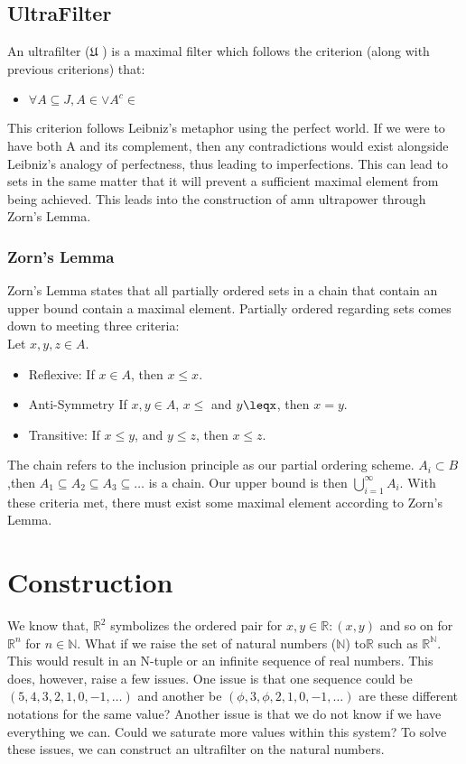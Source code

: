 \documentclass[12pt]{report}
\newcommand{\R}{\mathbb{R}}
\newcommand{\N}{\mathbb{N}}
\begin{document}
\section*{UltraFilter}
An ultrafilter ($\mathfrak{U}$ ) is a maximal filter which follows the criterion (along with previous criterions) that:
\begin{itemize}
    \item $\forall A \subseteq J , A \in $$ \lor A^c \in $$ $
\end{itemize}
This criterion follows Leibniz's metaphor using the perfect world.
If we were to have both A and its complement, then any contradictions would exist alongside Leibniz's analogy of perfectness, thus leading to imperfections.
This can lead to sets in the same matter that it will prevent a sufficient maximal element from being achieved.
This leads into the construction of amn ultrapower through Zorn's Lemma.
\subsection*{Zorn's Lemma}
Zorn's Lemma states that all partially ordered sets in a chain that contain an upper bound contain a maximal element.
Partially ordered regarding sets comes down to meeting three criteria:\\
Let $x,y,z \in A$.
\begin{itemize}
    \item Reflexive: If $x \in A$, then $x\leq x$.
    \item Anti-Symmetry If $x,y \in A$, $x\leq$ and $y\leqx$, then $x=y$.
    \item Transitive: If $x \leq y$, and $y \leq z$, then $x \leq z$.
\end{itemize}
The chain refers to the inclusion principle as our partial ordering scheme.
$A_i \subset B$ ,then $A_1\subseteq A_2\subseteq A_3\subseteq\ldots$ is a chain.
Our upper bound is then $\bigcup_{i=1}^{\infty}A_i$.
With these criteria met, there must exist some maximal element according to Zorn's Lemma.

\chapter{Construction}
We know that, $\R^2 $ symbolizes the ordered pair for $x, y \in \R: (x, y)$ and so on for $\R^n$ for $n \in \N$.
What if we raise the set of natural numbers ($\N$) to$ \R$ such as $\R^{\N}$.
This would result in an N-tuple or an infinite sequence of real numbers.
This does, however, raise a few issues.
One issue is that one sequence could be $(5,4,3,2,1,0,-1,\ldots)$ and another be $(\phi,3,\phi, 2,1,0,-1,\ldots)$ are these different notations for the same value?
Another issue is that we do not know if we have everything we can.
Could we saturate more values within this system?
To solve these issues, we can construct an ultrafilter on the natural numbers.\par
\end{document}
